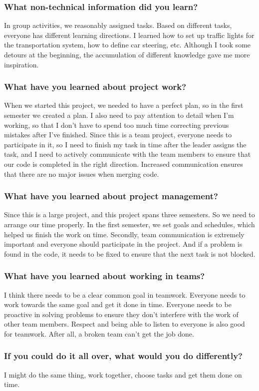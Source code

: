 \documentclass[onecolumn, draftclsnofoot,10pt, compsoc]{IEEEtran}
\begin{document}
\subsubsection{What non-technical information did you learn?}
In group activities, we reasonably assigned tasks.
Based on different tasks, everyone has different learning directions.
I learned how to set up traffic lights for the transportation system, how to define car steering, etc.
Although I took some detours at the beginning, the accumulation of different knowledge gave me more inspiration.
\subsubsection{What have you learned about project work?}
When we started this project, we needed to have a perfect plan, so in the first semester we created a plan.
I also need to pay attention to detail when I'm working, so that I don't have to spend too much time correcting previous mistakes after I've finished.
Since this is a team project, everyone needs to participate in it, so I need to finish my task in time after the leader assigns the task, and I need to actively communicate with the team members to ensure that our code is completed in the right direction.
Increased communication ensures that there are no major issues when merging code.
\subsubsection{What have you learned about project management?}
Since this is a large project, and this project spans three semesters.
So we need to arrange our time properly.
In the first semester, we set goals and schedules, which helped us finish the work on time.
Secondly, team communication is extremely important and everyone should participate in the project.
And if a problem is found in the code, it needs to be fixed to ensure that the next task is not blocked.
\subsubsection{What have you learned about working in teams?}
I think there needs to be a clear common goal in teamwork.
Everyone needs to work towards the same goal and get it done in time.
Everyone needs to be proactive in solving problems to ensure they don't interfere with the work of other team members.
Respect and being able to listen to everyone is also good for teamwork.
After all, a broken team can't get the job done.
\subsubsection{If you could do it all over, what would you do differently?}
I might do the same thing, work together, choose tasks and get them done on time.
\end{document}
